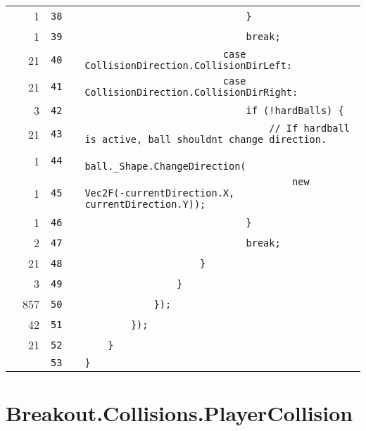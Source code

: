 \documentclass[a4paper,landscape,10pt]{article}
\begin{document}
\begin{longtable}[l]{lrrll}
\cellcolor{green} & 1 & \verb~38~ & & \verb~                            }~\\
\cellcolor{green} & 1 & \verb~39~ & & \verb~                            break;~\\
\cellcolor{green} & 21 & \verb~40~ & & \verb~                        case CollisionDirection.CollisionDirLeft:~\\
\cellcolor{green} & 21 & \verb~41~ & & \verb~                        case CollisionDirection.CollisionDirRight:~\\
\cellcolor{green} & 3 & \verb~42~ & & \verb~                            if (!hardBalls) {~\\
\cellcolor{green} & 21 & \verb~43~ & & \verb~                                // If hardball is active, ball shouldnt change direction.~\\
\cellcolor{green} & 1 & \verb~44~ & & \verb~                                ball._Shape.ChangeDirection(~\\
\cellcolor{green} & 1 & \verb~45~ & & \verb~                                    new Vec2F(-currentDirection.X, currentDirection.Y));~\\
\cellcolor{green} & 1 & \verb~46~ & & \verb~                            }~\\
\cellcolor{green} & 2 & \verb~47~ & & \verb~                            break;~\\
\cellcolor{green} & 21 & \verb~48~ & & \verb~                    }~\\
\cellcolor{green} & 3 & \verb~49~ & & \verb~                }~\\
\cellcolor{green} & 857 & \verb~50~ & & \verb~            });~\\
\cellcolor{green} & 42 & \verb~51~ & & \verb~        });~\\
\cellcolor{green} & 21 & \verb~52~ & & \verb~    }~\\
\cellcolor{gray} &  & \verb~53~ & & \verb~}~\\
\end{longtable}
\newpage
\section{Breakout.Collisions.PlayerCollision}
\end{document}
